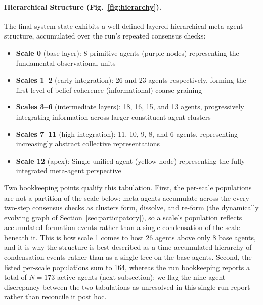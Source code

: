 \documentclass[11pt]{article}
\begin{document}
\paragraph{Hierarchical Structure (Fig.~\ref{fig:hierarchy}).}
The final system state exhibits a well-defined layered hierarchical meta-agent structure, accumulated over the run's repeated consensus checks:
\begin{itemize}
\item \textbf{Scale 0} (base layer): 8 primitive agents (purple nodes) representing the fundamental observational units
\item \textbf{Scales 1--2} (early integration): 26 and 23 agents respectively, forming the first level of belief-coherence (informational) coarse-graining
\item \textbf{Scales 3--6} (intermediate layers): 18, 16, 15, and 13 agents, progressively integrating information across larger constituent agent clusters
\item \textbf{Scales 7--11} (high integration): 11, 10, 9, 8, and 6 agents, representing increasingly abstract collective representations
\item \textbf{Scale 12} (apex): Single unified agent (yellow node) representing the fully integrated meta-agent perspective
\end{itemize}

Two bookkeeping points qualify this tabulation. First, the per-scale populations are not a partition of the scale below: meta-agents accumulate across the every-two-step consensus checks as clusters form, dissolve, and re-form (the dynamically evolving graph of Section~\ref{sec:participatory}), so a scale's population reflects accumulated formation events rather than a single condensation of the scale beneath it. This is how scale 1 comes to host 26 agents above only 8 base agents, and it is why the structure is best described as a time-accumulated hierarchy of condensation events rather than as a single tree on the base agents. Second, the listed per-scale populations sum to 164, whereas the run bookkeeping reports a total of $N = 173$ active agents (next subsection); we flag the nine-agent discrepancy between the two tabulations as unresolved in this single-run report rather than reconcile it post hoc.
\end{document}
